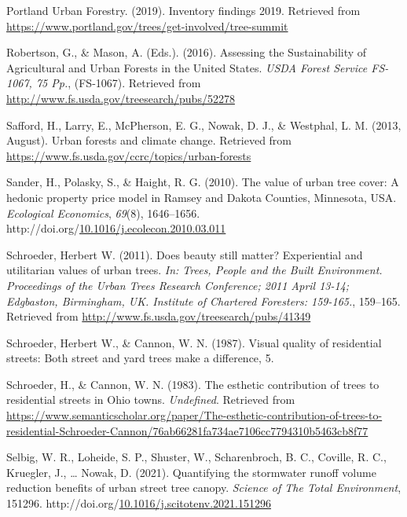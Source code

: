 \documentclass[12pt,twoside]{reedthesis}
\newlength{\cslhangindent}
\newenvironment{CSLReferences}[2] %
 {%
  \setlength{\parindent}{0pt}
  \ifodd #1 \everypar{\setlength{\hangindent}{\cslhangindent}}\ignorespaces\fi
  \ifnum #2 > 0
  \setlength{\parskip}{#2\baselineskip}
  \fi
 }%
 {}
\begin{document}
\begin{CSLReferences}{1}{0}
\leavevmode{}%
Portland Urban Forestry. (2019). Inventory findings 2019. Retrieved from \url{https://www.portland.gov/trees/get-involved/tree-summit}

\leavevmode{}%
Robertson, G., \& Mason, A. (Eds.). (2016). Assessing the Sustainability of Agricultural and Urban Forests in the United States. \emph{USDA Forest Service FS-1067, 75 Pp.}, (FS-1067). Retrieved from \url{http://www.fs.usda.gov/treesearch/pubs/52278}

\leavevmode{}%
Safford, H., Larry, E., McPherson, E. G., Nowak, D. J., \& Westphal, L. M. (2013, August). Urban forests and climate change. Retrieved from \url{https://www.fs.usda.gov/ccrc/topics/urban-forests}

\leavevmode{}%
Sander, H., Polasky, S., \& Haight, R. G. (2010). The value of urban tree cover: A hedonic property price model in Ramsey and Dakota Counties, Minnesota, USA. \emph{Ecological Economics}, \emph{69}(8), 1646--1656. http://doi.org/\href{https://doi.org/10.1016/j.ecolecon.2010.03.011}{10.1016/j.ecolecon.2010.03.011}

\leavevmode{}%
Schroeder, Herbert W. (2011). Does beauty still matter? Experiential and utilitarian values of urban trees. \emph{In: Trees, People and the Built Environment. Proceedings of the Urban Trees Research Conference; 2011 April 13-14; Edgbaston, Birmingham, UK. Institute of Chartered Foresters: 159-165.}, 159--165. Retrieved from \url{http://www.fs.usda.gov/treesearch/pubs/41349}

\leavevmode{}%
Schroeder, Herbert W., \& Cannon, W. N. (1987). Visual quality of residential streets: Both street and yard trees make a difference, 5.

\leavevmode{}%
Schroeder, H., \& Cannon, W. N. (1983). The esthetic contribution of trees to residential streets in Ohio towns. \emph{Undefined}. Retrieved from \url{https://www.semanticscholar.org/paper/The-esthetic-contribution-of-trees-to-residential-Schroeder-Cannon/76ab66281fa734ae7106cc7794310b5463cb8f77}

\leavevmode{}%
Selbig, W. R., Loheide, S. P., Shuster, W., Scharenbroch, B. C., Coville, R. C., Kruegler, J., \ldots{} Nowak, D. (2021). Quantifying the stormwater runoff volume reduction benefits of urban street tree canopy. \emph{Science of The Total Environment}, 151296. http://doi.org/\href{https://doi.org/10.1016/j.scitotenv.2021.151296}{10.1016/j.scitotenv.2021.151296}


\end{CSLReferences}
\end{document}
